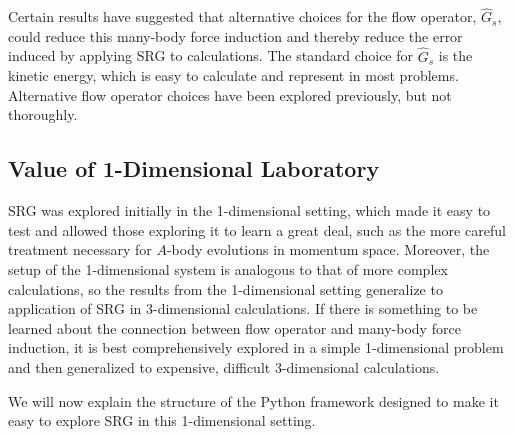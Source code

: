 Certain results have suggested that alternative choices for the flow operator, $\hat{G}_s$, could reduce this many-body force induction and thereby reduce the error induced by applying SRG to calculations. The standard choice for $\hat{G}_s$ is the kinetic energy, which is easy to calculate and represent in most problems. Alternative flow operator choices have been explored previously, but not thoroughly.

\subsection{Value of 1-Dimensional Laboratory}

SRG was explored initially in the 1-dimensional setting, which made it easy to test and allowed those exploring it to learn a great deal, such as the more careful treatment necessary for $A$-body evolutions in momentum space. Moreover, the setup of the 1-dimensional system is analogous to that of more complex calculations, so the results from the 1-dimensional setting generalize to application of SRG in 3-dimensional calculations. If there is something to be learned about the connection between flow operator and many-body force induction, it is best comprehensively explored in a simple 1-dimensional problem and then generalized to expensive, difficult 3-dimensional calculations.

We will now explain the structure of the Python framework designed to make it easy to explore SRG in this 1-dimensional setting.